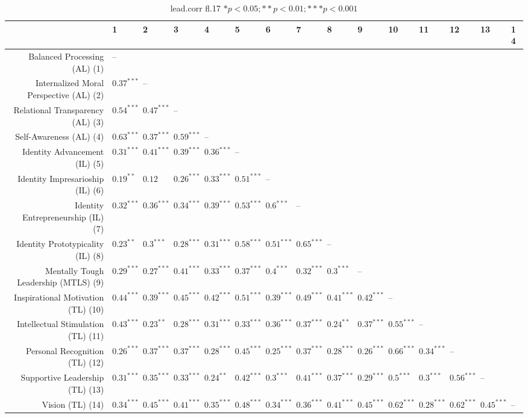 \begin{table}[ht]
\centering
\begin{tabular}{rllllllllllllll}
  \hline
 & 1 & 2 & 3 & 4 & 5 & 6 & 7 & 8 & 9 & 10 & 11 & 12 & 13 & 14 \\ 
  \hline
Balanced Processing (AL) (1) & -- &  &  &  &  &  &  &  &  &  &  &  &  &  \\ 
  Internalized Moral Perspective (AL) (2) & $0.37^{***}$ & -- &  &  &  &  &  &  &  &  &  &  &  &  \\ 
  Relational Transparency (AL) (3) & $0.54^{***}$ & $0.47^{***}$ & -- &  &  &  &  &  &  &  &  &  &  &  \\ 
  Self-Awareness (AL) (4) & $0.63^{***}$ & $0.37^{***}$ & $0.59^{***}$ & -- &  &  &  &  &  &  &  &  &  &  \\ 
  Identity Advancement (IL) (5) & $0.31^{***}$ & $0.41^{***}$ & $0.39^{***}$ & $0.36^{***}$ & -- &  &  &  &  &  &  &  &  &  \\ 
  Identity Impresarioship (IL) (6) & $0.19^{**}$ & $0.12$ & $0.26^{***}$ & $0.33^{***}$ & $0.51^{***}$ & -- &  &  &  &  &  &  &  &  \\ 
  Identity Entrepreneurship (IL) (7) & $0.32^{***}$ & $0.36^{***}$ & $0.34^{***}$ & $0.39^{***}$ & $0.53^{***}$ & $0.6^{***}$ & -- &  &  &  &  &  &  &  \\ 
  Identity Prototypicality (IL) (8) & $0.23^{**}$ & $0.3^{***}$ & $0.28^{***}$ & $0.31^{***}$ & $0.58^{***}$ & $0.51^{***}$ & $0.65^{***}$ & -- &  &  &  &  &  &  \\ 
  Mentally Tough Leadership (MTLS) (9) & $0.29^{***}$ & $0.27^{***}$ & $0.41^{***}$ & $0.33^{***}$ & $0.37^{***}$ & $0.4^{***}$ & $0.32^{***}$ & $0.3^{***}$ & -- &  &  &  &  &  \\ 
  Inspirational Motivation (TL) (10) & $0.44^{***}$ & $0.39^{***}$ & $0.45^{***}$ & $0.42^{***}$ & $0.51^{***}$ & $0.39^{***}$ & $0.49^{***}$ & $0.41^{***}$ & $0.42^{***}$ & -- &  &  &  &  \\ 
  Intellectual Stimulation (TL) (11) & $0.43^{***}$ & $0.23^{**}$ & $0.28^{***}$ & $0.31^{***}$ & $0.33^{***}$ & $0.36^{***}$ & $0.37^{***}$ & $0.24^{**}$ & $0.37^{***}$ & $0.55^{***}$ & -- &  &  &  \\ 
  Personal Recognition (TL) (12) & $0.26^{***}$ & $0.37^{***}$ & $0.37^{***}$ & $0.28^{***}$ & $0.45^{***}$ & $0.25^{***}$ & $0.37^{***}$ & $0.28^{***}$ & $0.26^{***}$ & $0.66^{***}$ & $0.34^{***}$ & -- &  &  \\ 
  Supportive Leadership (TL) (13) & $0.31^{***}$ & $0.35^{***}$ & $0.33^{***}$ & $0.24^{**}$ & $0.42^{***}$ & $0.3^{***}$ & $0.41^{***}$ & $0.37^{***}$ & $0.29^{***}$ & $0.5^{***}$ & $0.3^{***}$ & $0.56^{***}$ & -- &  \\ 
  Vision (TL) (14) & $0.34^{***}$ & $0.45^{***}$ & $0.41^{***}$ & $0.35^{***}$ & $0.48^{***}$ & $0.34^{***}$ & $0.36^{***}$ & $0.41^{***}$ & $0.45^{***}$ & $0.62^{***}$ & $0.28^{***}$ & $0.62^{***}$ & $0.45^{***}$ & -- \\ 
   \hline
\end{tabular}
\caption{lead.corr fl.17 $* p < 0.05; ** p < 0.01; *** p < 0.001$} 
\label{freq_corr.lead.corr.fl.17}
\end{table}
